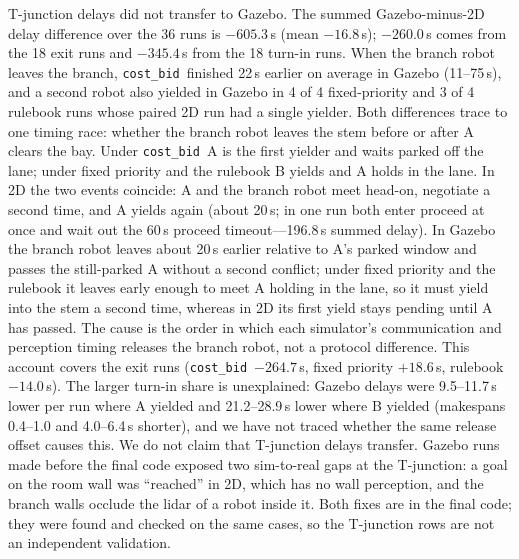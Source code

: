 \documentclass[letterpaper,journal]{IEEEtran}
\newcommand{\cb}{\texttt{cost\_bid}}
\begin{document}
T-junction delays did not transfer to Gazebo. The summed Gazebo-minus-2D delay difference over the 36 runs is $-605.3$\,s (mean $-16.8$\,s); $-260.0$\,s comes from the 18 exit runs and $-345.4$\,s from the 18 turn-in runs. When the branch robot leaves the branch, \cb\ finished 22\,s earlier on average in Gazebo (11--75\,s), and a second robot also yielded in Gazebo in 4 of 4 fixed-priority and 3 of 4 rulebook runs whose paired 2D run had a single yielder. Both differences trace to one timing race: whether the branch robot leaves the stem before or after A clears the bay. Under \cb\ A is the first yielder and waits parked off the lane; under fixed priority and the rulebook B yields and A holds in the lane. In 2D the two events coincide: A and the branch robot meet head-on, negotiate a second time, and A yields again (about 20\,s; in one run both enter proceed at once and wait out the 60\,s proceed timeout---196.8\,s summed delay). In Gazebo the branch robot leaves about 20\,s earlier relative to A's parked window and passes the still-parked A without a second conflict; under fixed priority and the rulebook it leaves early enough to meet A holding in the lane, so it must yield into the stem a second time, whereas in 2D its first yield stays pending until A has passed. The cause is the order in which each simulator's communication and perception timing releases the branch robot, not a protocol difference. This account covers the exit runs (\cb\ $-264.7$\,s, fixed priority $+18.6$\,s, rulebook $-14.0$\,s). The larger turn-in share is unexplained: Gazebo delays were 9.5--11.7\,s lower per run where A yielded and 21.2--28.9\,s lower where B yielded (makespans 0.4--1.0 and 4.0--6.4\,s shorter), and we have not traced whether the same release offset causes this. We do not claim that T-junction delays transfer. Gazebo runs made before the final code exposed two sim-to-real gaps at the T-junction: a goal on the room wall was ``reached'' in 2D, which has no wall perception, and the branch walls occlude the lidar of a robot inside it. Both fixes are in the final code; they were found and checked on the same cases, so the T-junction rows are not an independent validation. %
\end{document}
